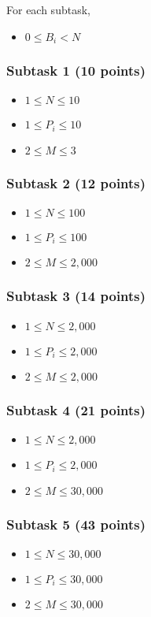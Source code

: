 \documentclass{report}
\begin{document}
For each subtask,
\begin{itemize}
\item $0 \le B_i < N$
\end{itemize}

\subsubsection{Subtask 1 (10 points)}
\begin{itemize} \itemsep1pt \parskip0pt
\item $1 \le N \le 10$
\item $1 \le P_i \le 10$
\item $2 \le M \le 3$
\end{itemize}

\subsubsection{Subtask 2 (12 points)}
\begin{itemize} \itemsep1pt \parskip0pt
\item $1 \le N \le 100$
\item $1 \le P_i \le 100$
\item $2 \le M \le 2,000$
\end{itemize}

\subsubsection{Subtask 3 (14 points)}
\begin{itemize} \itemsep1pt \parskip0pt
\item $1 \le N \le 2,000$
\item $1 \le P_i \le 2,000$
\item $2 \le M \le 2,000$
\end{itemize}

\subsubsection{Subtask 4 (21 points)}
\begin{itemize} \itemsep1pt \parskip0pt
\item $1 \le N \le 2,000$
\item $1 \le P_i \le 2,000$
\item $2 \le M \le 30,000$
\end{itemize}

\subsubsection{Subtask 5 (43 points)}
\begin{itemize} \itemsep1pt \parskip0pt
\item $1 \le N \le 30,000$
\item $1 \le P_i \le 30,000$
\item $2 \le M \le 30,000$
\end{itemize}
\end{document}
